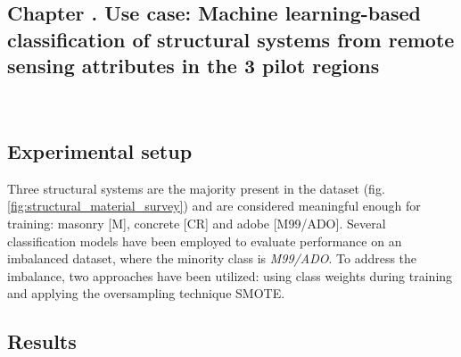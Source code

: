 \graphicspath{
    {figures_and_references/urban_surface_detection/}
    {figures_and_references/EELISA_conference/}
    {figures_and_references/footprints_paper/}
}

\renewcommand{\chapternametext}{Chapter \thechapter . Use case: Machine learning-based classification of structural systems from remote sensing attributes in the 3 pilot regions}
\renewcommand{\shortchapternametext}{Chapter \thechapter . Use case: Structural system classification}

\begin{refsection}

\chapter{\chapternametext}
\

\renewcommand{\headingtextL}{}
\renewcommand{\headingtextR}{\shortchapternametext}
\begingroup
 \flushbottom
 \setlength{\parskip}{0pt plus 1fil}%
 \localtableofcontents 
\endgroup

\begingroup
 \flushbottom
 \setlength{\parskip}{0pt plus 1fil}%
 \locallistoffigures
 \locallistoftables
\endgroup


\newpage

\setcounter{section}{0} 



\FloatBarrier

\renewcommand{\sectionnametext}{Experimental setup}
\renewcommand{\headingtextL}{\shortchapternametext}
\renewcommand{\headingtextR}{\thesection. \sectionnametext}
\section{\sectionnametext}

Three structural systems are the majority present in the dataset (fig. \ref{fig:structural_material_survey}) and are considered meaningful enough for training: masonry [M], concrete [CR] and adobe [M99/ADO]. Several classification models have been employed to evaluate performance on an imbalanced dataset, where the minority class is \textit{M99/ADO}. To address the imbalance, two approaches have been utilized: using class weights during training and applying the oversampling technique SMOTE. 

\renewcommand{\sectionnametext}{Results}
\renewcommand{\headingtextR}{\thesection. \sectionnametext}
\section{\sectionnametext}


\end{refsection}
